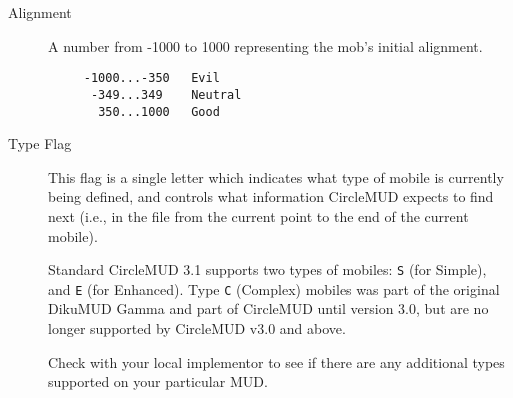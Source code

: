 \documentclass[11pt]{article}
\begin{document}
\begin{description}
\item[Alignment] A number from -1000 to 1000 representing the mob's initial alignment.
\begin{verbatim}
     -1000...-350   Evil
      -349...349    Neutral
       350...1000   Good
\end{verbatim}
\item[Type Flag] This flag is a single letter which indicates what type of mobile is currently being defined, and controls what information CircleMUD expects to find next (i.e., in the file from the current point to the end of the current mobile).
\par
Standard CircleMUD 3.1 supports two types of mobiles: \texttt{S} (for Simple), and \texttt{E} (for Enhanced).  Type \texttt{C} (Complex) mobiles was part of the original DikuMUD Gamma and part of CircleMUD until version 3.0, but are no longer supported by CircleMUD v3.0 and above.
\par
Check with your local implementor to see if there are any additional types supported on your particular MUD.
\end{description}
\end{document}
